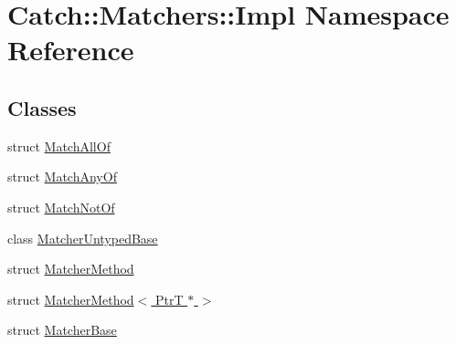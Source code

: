 \hypertarget{namespace_catch_1_1_matchers_1_1_impl}{\section{Catch\-:\-:Matchers\-:\-:Impl Namespace Reference}
\label{namespace_catch_1_1_matchers_1_1_impl}
}
\subsection*{Classes}
\begin{DoxyCompactItemize}
\item 
struct \hyperlink{struct_catch_1_1_matchers_1_1_impl_1_1_match_all_of}{Match\-All\-Of}
\item 
struct \hyperlink{struct_catch_1_1_matchers_1_1_impl_1_1_match_any_of}{Match\-Any\-Of}
\item 
struct \hyperlink{struct_catch_1_1_matchers_1_1_impl_1_1_match_not_of}{Match\-Not\-Of}
\item 
class \hyperlink{class_catch_1_1_matchers_1_1_impl_1_1_matcher_untyped_base}{Matcher\-Untyped\-Base}
\item 
struct \hyperlink{struct_catch_1_1_matchers_1_1_impl_1_1_matcher_method}{Matcher\-Method}
\item 
struct \hyperlink{struct_catch_1_1_matchers_1_1_impl_1_1_matcher_method_3_01_ptr_t_01_5_01_4}{Matcher\-Method$<$ Ptr\-T $\ast$ $>$}
\item 
struct \hyperlink{struct_catch_1_1_matchers_1_1_impl_1_1_matcher_base}{Matcher\-Base}
\end{DoxyCompactItemize}
